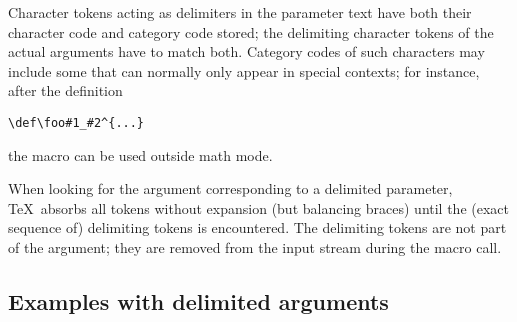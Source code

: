 \documentclass[letterpaper]{book}
\begin{document}
Character tokens acting as delimiters in the parameter text
have both their character code and
category code stored; the delimiting character tokens of the
actual arguments have to match both.
Category codes of such characters may include some that
can normally only appear in special contexts; for instance, after
the definition
\begin{verbatim}
\def\foo#1_#2^{...}
\end{verbatim}
the macro 
can be used outside math mode.

When looking for the argument corresponding to
a delimited parameter, \TeX\ absorbs all tokens without expansion (but
balancing braces) until the 
(exact sequence of) delimiting tokens is encountered.
The delimiting tokens are not part of the argument;
they are removed from the input stream during the macro call.

\subsection{Examples with delimited arguments}
\end{document}
